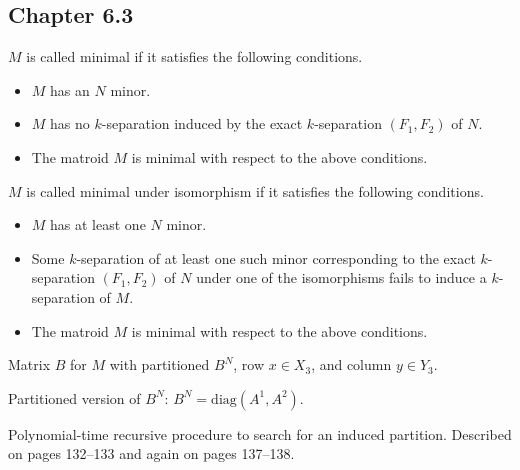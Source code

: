 \subsection{Chapter 6.3}

\begin{definition}[6.3.2]
  \label{def:6.3.2}
  $M$ is called minimal if it satisfies the following conditions.
  \begin{itemize}
    \item $M$ has an $N$ minor.
    \item $M$ has no $k$-separation induced by the exact $k$-separation $(F_{1}, F_{2})$ of $N$.
    \item The matroid $M$ is minimal with respect to the above conditions.
  \end{itemize}
\end{definition}

\begin{definition}[6.3.3]
  \label{def:6.3.3}
  $M$ is called minimal under isomorphism if it satisfies the following conditions.
  \begin{itemize}
    \item $M$ has at least one $N$ minor.
    \item Some $k$-separation of at least one such minor corresponding to the exact $k$-separation $(F_{1}, F_{2})$ of $N$ under one of the isomorphisms fails to induce a $k$-separation of $M$.
    \item The matroid $M$ is minimal with respect to the above conditions.
  \end{itemize}
\end{definition}

\begin{proposition}[6.3.11]
  \label{prop:6.3.11}
  Matrix $B$ for $M$ with partitioned $B^{N}$, row $x \in X_{3}$, and column $y \in Y_{3}$.
\end{proposition}

\begin{proposition}[6.3.12]
  \label{prop:6.3.12}
  Partitioned version of $B^{N}$: $B^{N} = \mathrm{diag}(A^{1}, A^{2})$.
\end{proposition}

\begin{definition}
  \label{def:separation_algorithm}
  Polynomial-time recursive procedure to search for an induced partition. Described on pages 132--133 and again on pages 137--138.
\end{definition}

